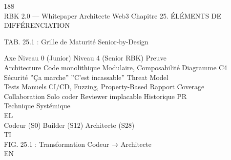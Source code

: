 \documentclass[12pt,landscape,a4paper]{article}
\begin{document}
\vspace{0.5em}
188\\
RBK 2.0 — Whitepaper Architecte Web3                                                            Chapitre 25. ÉLÉMENTS DE DIFFÉRENCIATION\\
\vspace{0.5em}
\vspace{0.5em}
\begin{center}\begin{tabular}TAB. 25.1 : Grille de Maturité Senior-by-Design\end{tabular}\end{center}
\vspace{0.5em}
\vspace{0.5em}
Axe           Niveau 0 (Junior) Niveau 4 (Senior RBK)          Preuve\\
Architecture Code monolithique Modulaire, Composabilité        Diagramme C4\\
Sécurité      ”Ça marche”       ”C’est incassable”             Threat Model\\
Tests         Manuels           CI/CD, Fuzzing, Property-Based Rapport Coverage\\
Collaboration Solo coder        Reviewer implacable            Historique PR\\
\vspace{0.5em}
\vspace{0.5em}
\vspace{0.5em}
\vspace{0.5em}
Technique          Systémique\\
\vspace{0.5em}
\vspace{0.5em}
\vspace{0.5em}
\vspace{0.5em}
EL\\
Codeur (S0)      Builder (S12)      Architecte (S28)\\
\vspace{0.5em}
\vspace{0.5em}
\vspace{0.5em}
\vspace{0.5em}
TI\\
FIG. 25.1 : Transformation Codeur → Architecte\\
\vspace{0.5em}
\vspace{0.5em}
\vspace{0.5em}
\vspace{0.5em}
EN\\
\end{document}
